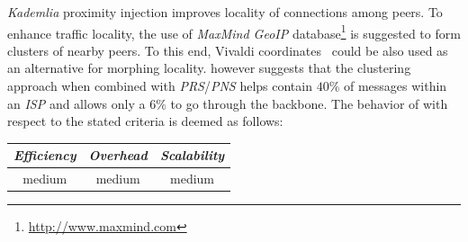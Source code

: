 
\emph{Kademlia} proximity injection improves 
locality of connections among peers.
To enhance traffic locality, the use of 
{\sl MaxMind GeoIP} database\footnote{\url{http://www.maxmind.com}} 
is suggested to form clusters of nearby peers.
To this end, Vivaldi coordinates~\cite{cox_vivaldi_2004} could be 
also used as an alternative for morphing locality. 
\cite{KLKP2008} however suggests that the clustering approach 
when combined with \emph{PRS}/\emph{PNS} helps contain 
$40\%$ of messages within an \emph{ISP} and allows only a $6\%$ 
to go through the backbone.
The behavior of \cite{KLKP2008} with respect to the stated criteria is deemed as follows:
\begin{center}
{\footnotesize
\begin{tabular}{ccc}
\emph{Efficiency} & \emph{Overhead} & \emph{Scalability} \\
\hline
medium &
% 
medium &
medium
\end{tabular}
}
\end{center}



